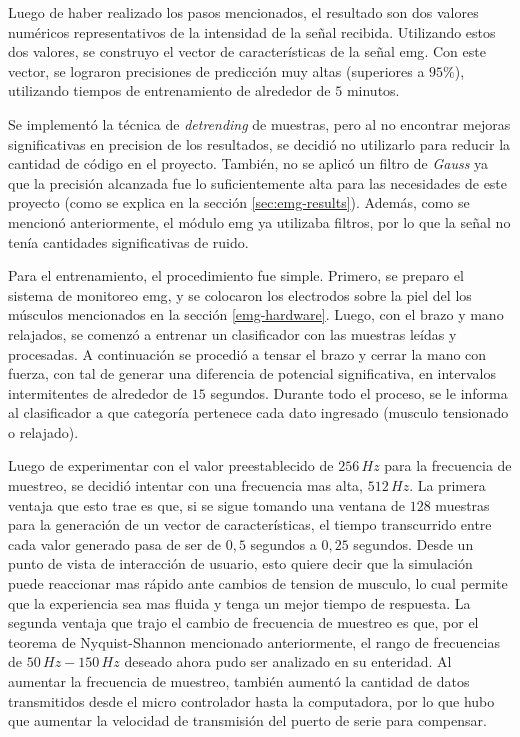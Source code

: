 Luego de haber realizado los pasos mencionados, el resultado son dos valores numéricos representativos de la intensidad de la señal recibida.  Utilizando estos dos valores, se construyo el vector de características de la señal \acrshort{emg}. Con este vector, se lograron precisiones de predicción muy altas (superiores a $ 95 \%$), utilizando tiempos de entrenamiento de alrededor de $5$ minutos.

Se implementó la técnica de \emph{detrending} de muestras, pero al no encontrar mejoras significativas en precision de los resultados, se decidió no utilizarlo para reducir la cantidad de código en el proyecto. También, no se aplicó un filtro de \emph{Gauss} ya que la precisión alcanzada fue lo suficientemente alta para las necesidades de este proyecto (como se explica en la sección \ref{sec:emg-results}). Además, como se mencionó anteriormente, el módulo \acrshort{emg} ya utilizaba filtros, por lo que la señal no tenía cantidades significativas de ruido.

Para el entrenamiento, el procedimiento fue simple. Primero, se preparo el sistema de monitoreo \acrshort{emg}, y se colocaron los electrodos sobre la piel del los músculos mencionados en la sección \ref{emg-hardware}. Luego, con el brazo y mano relajados, se comenzó a entrenar un clasificador con las muestras leídas y procesadas. A continuación se procedió a tensar el brazo y cerrar la mano con fuerza, con tal de generar una diferencia de potencial significativa, en intervalos intermitentes de alrededor de $15$ segundos. Durante todo el proceso, se le informa al clasificador a que categoría pertenece cada dato ingresado (musculo tensionado o relajado).

Luego de experimentar con el valor preestablecido de $256\,Hz$ para la frecuencia de muestreo, se decidió intentar con una frecuencia mas alta, $512\,Hz$. La primera ventaja que esto trae es que, si se sigue tomando una ventana de $128$ muestras para la generación de un vector de características, el tiempo transcurrido entre cada valor generado pasa de ser de $0,5$ segundos a $0,25$ segundos. Desde un punto de vista de interacción de usuario, esto quiere decir que la simulación puede reaccionar mas rápido ante cambios de tension de musculo, lo cual permite que la experiencia sea mas fluida y tenga un mejor tiempo de respuesta. La segunda ventaja que trajo el cambio de frecuencia de muestreo es que, por el teorema de Nyquist-Shannon mencionado anteriormente, el rango de frecuencias de $50 \, Hz-150 \, Hz$ deseado ahora pudo ser analizado en su enteridad. Al aumentar la frecuencia de muestreo, también aumentó la cantidad de datos transmitidos desde el micro controlador hasta la computadora, por lo que hubo que aumentar la velocidad de transmisión del puerto de serie para compensar.

